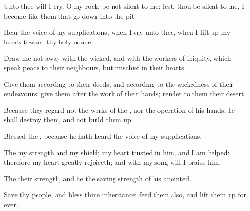 {\Q {}Unto thee will I
cry, O
{} my
rock; be not
silent to me: lest,
{} thou be
silent to me, I
become like them that go
down into the
pit.


\par }{\Q {}Hear the
voice of my
supplications, when I
cry unto thee, when I lift
up my
hands toward thy
holy
oracle.


\par }{\Q {}Draw me not
away with the
wicked, and with the
workers of
iniquity, which
speak
peace to their
neighbours, but
mischief
{} in their
hearts.


\par }{\Q {}Give them according to their
deeds, and according to the
wickedness of their
endeavours:
give them after the
work of their
hands;
render to them their
desert.


\par }{\Q {}Because they
regard not the
works of the
{}, nor the
operation of his
hands, he shall
destroy them, and not build them
up.


\par }{\BB \par }
{\Q {}Blessed
{} the
{}, because he hath
heard the
voice of my
supplications.


\par }{\Q {}The
{}
{} my
strength and my
shield; my
heart
trusted in him, and I am
helped: therefore my
heart greatly
rejoiceth; and with my
song will I
praise him.


\par }{\Q {}The
{}
{} their
strength, and he
{} the
saving
strength of his
anointed.


\par }{\Q {}Save thy
people, and
bless thine
inheritance:
feed them also, and lift them
up for
ever.




\par }
